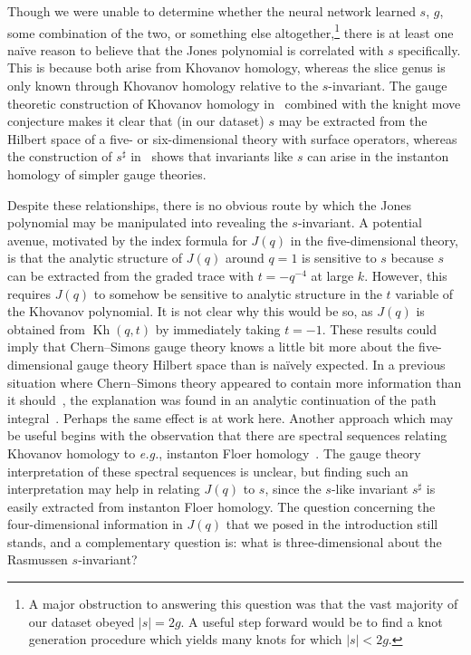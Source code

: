 \documentclass[11pt]{article}
\DeclareMathOperator{\Kh}{Kh}
\numberwithin{equation}{section}
\begin{document}
Though we were unable to determine whether the neural network learned $s$, $g$, some combination of the two, or something else altogether,\footnote{A major obstruction to answering this question was that the vast majority of our dataset obeyed $|s| = 2g$.  A useful step forward would be to find a knot generation procedure which yields many knots for which $|s| < 2g$.} there is at least one na\"ive reason to believe that the Jones polynomial is correlated with $s$ specifically.
This is because both arise from Khovanov homology, whereas the slice genus is only known through Khovanov homology relative to the $s$-invariant.
The gauge theoretic construction of Khovanov homology in~\cite{Witten:2011zz} combined with the knight move conjecture makes it clear that (in our dataset) $s$ may be extracted from the Hilbert space of a five- or six-dimensional theory with surface operators, whereas the construction of $s^\sharp$ in~\cite{kronheimer2013} shows that invariants like $s$ can arise in the instanton homology of simpler gauge theories.

Despite these relationships, there is no obvious route by which the Jones polynomial may be manipulated into revealing the $s$-invariant.
A potential avenue, motivated by the index formula for $J(q)$ in the five-dimensional theory, is that the analytic structure of $J(q)$ around $q=1$ is sensitive to $s$ because $s$ can be extracted from the graded trace with $t = -q^{-4}$ at large $k$.
However, this requires $J(q)$ to somehow be sensitive to analytic structure in the $t$ variable of the Khovanov polynomial.
It is not clear why this would be so, as $J(q)$ is obtained from $\Kh(q,t)$ by immediately taking $t=-1$.
These results could imply that Chern--Simons gauge theory knows a little bit more about the five-dimensional gauge theory Hilbert space than is na\"ively expected.
In a previous situation where Chern--Simons theory appeared to contain more information than it should~\cite{Jejjala:2019kio}, the explanation was found in an analytic continuation of the path integral~\cite{Craven:2020bdz}.
Perhaps the same effect is at work here.
Another approach which may be useful begins with the observation that there are spectral sequences relating Khovanov homology to \textit{e.g.}, instanton Floer homology~\cite{kronheimer2010khovanov,kronheimer2012filtrations}.
The gauge theory interpretation of these spectral sequences is unclear, but finding such an interpretation may help in relating $J(q)$ to $s$, since the $s$-like invariant $s^\sharp$ is easily extracted from instanton Floer homology.
The question concerning the four-dimensional information in $J(q)$ that we posed in the introduction still stands, and a complementary question is: what is three-dimensional about the Rasmussen $s$-invariant?
\end{document}
